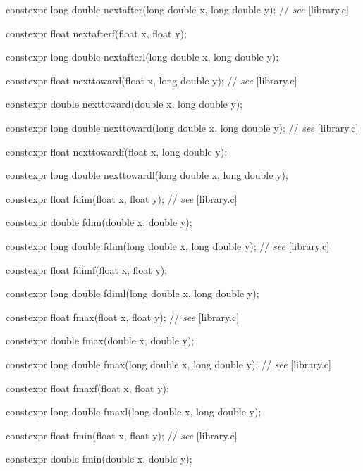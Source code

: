 \documentclass[prd,twocolumn,amsmath,amssymb,nofootinbib,eqsecnum]{revtex4-1}
\newcommand{\highlight}[1]{{\color{red} #1}}
\newcommand{\stdcomment}[1]{{// {\em see} [#1]}}
\begin{document}
{\highlight{constexpr}  long double nextafter(long double x, long double y); \stdcomment{library.c}

\highlight{constexpr}  float nextafterf(float x, float y);

\highlight{constexpr}  long double nextafterl(long double x, long double y);

\vspace{2ex}

\highlight{constexpr}  float nexttoward(float x, long double y); \stdcomment{library.c}

\highlight{constexpr}  double nexttoward(double x, long double y);

\highlight{constexpr}  long double nexttoward(long double x, long double y); \stdcomment{library.c}

\highlight{constexpr}  float nexttowardf(float x, long double y);

\highlight{constexpr}  long double nexttowardl(long double x, long double y);

\vspace{2ex}

\highlight{constexpr}  float fdim(float x, float y); \stdcomment{library.c}

\highlight{constexpr}  double fdim(double x, double y);

\highlight{constexpr}  long double fdim(long double x, long double y); \stdcomment{library.c}

\highlight{constexpr}  float fdimf(float x, float y);

\highlight{constexpr}  long double fdiml(long double x, long double y);

\vspace{2ex}

\highlight{constexpr}  float fmax(float x, float y); \stdcomment{library.c}

\highlight{constexpr}  double fmax(double x, double y);

\highlight{constexpr}  long double fmax(long double x, long double y); \stdcomment{library.c}

\highlight{constexpr}  float fmaxf(float x, float y);

\highlight{constexpr}  long double fmaxl(long double x, long double y);

\vspace{2ex}

\highlight{constexpr} float fmin(float x, float y); \stdcomment{library.c}

\highlight{constexpr}  double fmin(double x, double y);

}
\end{document}

